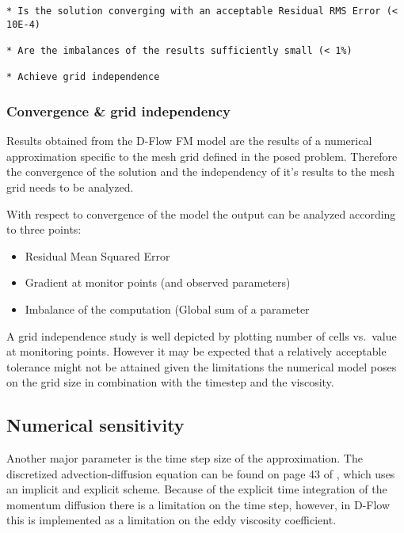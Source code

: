 \begin{verbatim}
* Is the solution converging with an acceptable Residual RMS Error (< 10E-4)

* Are the imbalances of the results sufficiently small (< 1%)

* Achieve grid independence
\end{verbatim}

\subsubsection{Convergence \& grid
independency}\label{convergence-grid-independency}

Results obtained from the D-Flow FM model are the results of a numerical
approximation specific to the mesh grid defined in the posed problem.
Therefore the convergence of the solution and the independency of it's
results to the mesh grid needs to be analyzed.

With respect to convergence of the model the output can be analyzed
according to three points:

\begin{itemize}
\item
  Residual Mean Squared Error
\item
  Gradient at monitor points (and observed parameters)
\item
  Imbalance of the computation (Global sum of a parameter
\end{itemize}

A grid independence study is well depicted by plotting number of cells
vs.~value at monitoring points. However it may be expected that a
relatively acceptable tolerance might not be attained given the
limitations the numerical model poses on the grid size in combination
with the timestep and the viscosity.

\subsection{Numerical sensitivity}\label{numerical-sensitivity}

Another major parameter is the time step size of the approximation. The
discretized advection-diffusion equation can be found on page 43 of
\citet{DFlowTechMan}, which uses an implicit and explicit scheme.
Because of the explicit time integration of the momentum diffusion there
is a limitation on the time step, however, in D-Flow this is implemented
as a limitation on the eddy viscosity coefficient.

